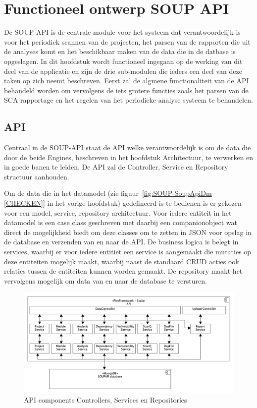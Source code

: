 \chapter{Functioneel ontwerp SOUP API}\label{ch:impl soup api}
De SOUP-API is de centrale module voor het systeem dat verantwoordelijk is voor het periodiek scannen van de projecten, het parsen van de rapporten die uit de analyses komt en het beschikbaar maken van de data die in de datbase is opgeslagen. In dit hoofdstuk wordt functioneel ingegaan op de werking van dit deel van de applicatie en zijn de drie sub-modulen die ieders een deel van deze taken op zich neemt beschreven. Eerst zal de algmene functionaliteit van de API behandeld worden om vervolgens de iets grotere functies zoals het parsen van de SCA rapportage en het regelen van het periodieke analyse systeem te behandelen.


\section{API}\label{sec:api2}
Centraal in de SOUP-API staat de API welke verantwoordelijk is om de data die door de beide Engines, beschreven in het hoofdstuk Architectuur, te verwerken en in goede banen te leiden. De API zal de Controller, Service en Repository structuur aanhouden.

Om de data die in het datamodel (zie figuur~\ref{fig:SOUP-SoupApiDm [CHECKEN]} in het vorige hoofdstuk) gedefineerd is te bedienen is er gekozen voor een model, service, repository architectuur. Voor iedere entiteit in het datamodel is een case class geschreven met daarbij een companionobject wat direct de mogelijkheid biedt om deze classes om te zetten in JSON voor opslag in de database en verzenden van en naar de API. De business logica is belegt in services, waarbij er voor iedere entitiet een service is aangemaakt die mutaties op deze entiteiten mogelijk maakt, waarbij naast de standaard CRUD acties ook relaties tussen de entiteiten kunnen worden gemaakt. De repository maakt het vervolgens mogelijk om data van en naar de database te versturen.

\begin{figure}[bth]
    \myfloatalign
    \includegraphics[width=12cm]{gfx/umlet/exports/API-ComponentsDiagram}
    \caption{API components Controllers, Services en Repositories}
    \label{fig:API components}
\end{figure}



